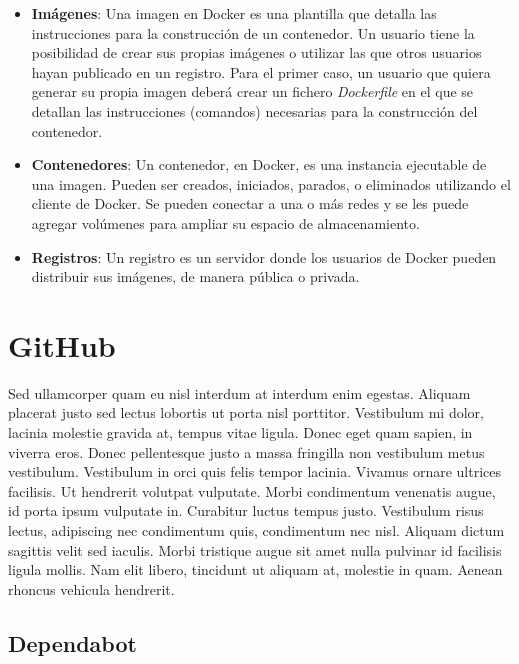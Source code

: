 \begin{itemize}
    \item \textbf{Imágenes}: Una imagen en Docker es una plantilla que detalla las instrucciones para la construcción de un contenedor. Un usuario tiene la posibilidad de crear sus propias imágenes o utilizar las que otros usuarios hayan publicado en un registro. Para el primer caso, un usuario que quiera generar su propia imagen deberá crear un fichero \emph{Dockerfile} en el que se detallan las instrucciones (comandos) necesarias para la construcción del contenedor.
    \item \textbf{Contenedores}: Un contenedor, en Docker, es una instancia ejecutable de una imagen. Pueden ser creados, iniciados, parados, o eliminados utilizando el cliente de Docker. Se pueden conectar a una o más redes y se les puede agregar volúmenes para ampliar su espacio de almacenamiento.
    \item \textbf{Registros}: Un registro es un servidor donde los usuarios de Docker pueden distribuir sus imágenes, de manera pública o privada.
\end{itemize}


\section{GitHub}

Sed ullamcorper quam eu nisl interdum at interdum enim egestas. Aliquam placerat justo sed lectus lobortis ut porta nisl porttitor. Vestibulum mi dolor, lacinia molestie gravida at, tempus vitae ligula. Donec eget quam sapien, in viverra eros. Donec pellentesque justo a massa fringilla non vestibulum metus vestibulum. Vestibulum in orci quis felis tempor lacinia. Vivamus ornare ultrices facilisis. Ut hendrerit volutpat vulputate. Morbi condimentum venenatis augue, id porta ipsum vulputate in. Curabitur luctus tempus justo. Vestibulum risus lectus, adipiscing nec condimentum quis, condimentum nec nisl. Aliquam dictum sagittis velit sed iaculis. Morbi tristique augue sit amet nulla pulvinar id facilisis ligula mollis. Nam elit libero, tincidunt ut aliquam at, molestie in quam. Aenean rhoncus vehicula hendrerit.

\subsection{Dependabot}

